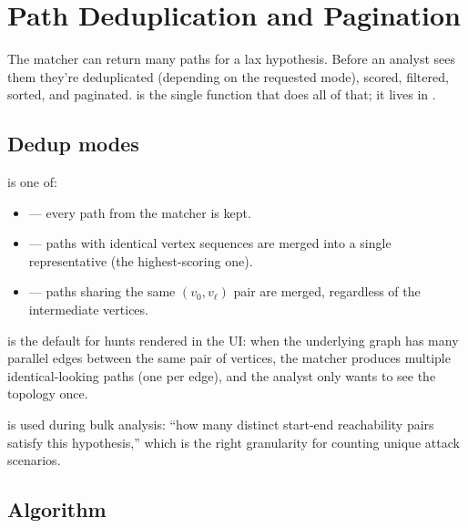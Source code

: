 \chapter{Path Deduplication and Pagination}
\label{ch:dedup-pagination}

The matcher can return many paths for a lax hypothesis. Before an
analyst sees them they're deduplicated (depending on the requested
mode), scored, filtered, sorted, and paginated.
 is the single function that does
all of that; it lives in .

\section{Dedup modes}

\begin{definition}
 is one of:
\begin{itemize}
    \item {} --- every path from the matcher is kept.
    \item {} --- paths with identical vertex sequences
        are merged into a single representative (the highest-scoring
        one).
    \item {} --- paths sharing the same $(v_0,
        v_\ell)$ pair are merged, regardless of the intermediate
        vertices.
\end{itemize}
\end{definition}

 is the default for hunts rendered in the UI: when the
underlying graph has many parallel edges between the same pair of
vertices, the matcher produces multiple identical-looking paths
(one per edge), and the analyst only wants to see the topology
once.

 is used during bulk analysis: ``how many
distinct start-end reachability pairs satisfy this hypothesis,''
which is the right granularity for counting unique attack
scenarios.

\section{Algorithm}

